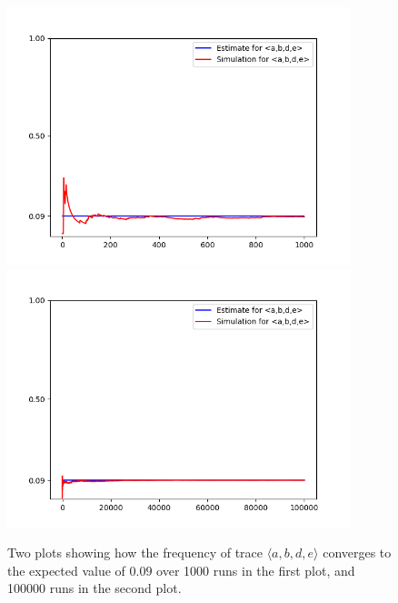 %
%
%
%
%
%
%
\begin{figure}%
    \centering
    {{\includegraphics[width=10cm]{figures/abde1.png} }}%
    \qquad
    {{\includegraphics[width=10cm]{figures/abde100.png} }}%
    \caption{Two plots showing how the frequency of trace $\langle a,b,d,e \rangle$ converges to the expected value of $0.09$ over 1000 runs in the first plot, and 100000 runs in the second plot.}%
    \label{fig: abde}%
\end{figure}
%
%
%
%
%
%

